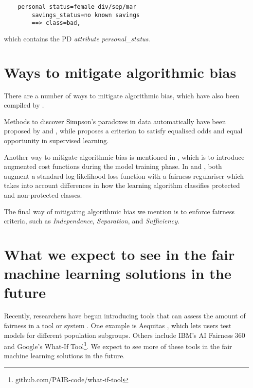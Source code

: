 \documentclass[conference]{IEEEtran}
\begin{document}
\begin{lstlisting}
    personal_status=female div/sep/mar 
        savings_status=no known savings 
        ==> class=bad,    
\end{lstlisting}

which contains the PD \emph{attribute personal\_status}.

\section{Ways to mitigate algorithmic bias}
There are a number of ways to mitigate algorithmic bias, which have also been compiled by \cite{DBLP:journals/corr/abs-1908-09635}.

Methods to discover Simpson’s paradoxes in data automatically have been proposed by \cite{DBLP:journals/corr/abs-1801-04385} and \cite{DBLP:journals/corr/abs-1805-03094}, while \cite{DBLP:journals/corr/HardtPS16} proposes a criterion to satisfy equalised odds and equal opportunity in supervised learning.

Another way to mitigate algorithmic bias is mentioned in \cite{d_Alessandro_2017}, which is to introduce augmented cost functions during the model training phase. In \cite{article} and \cite{DBLP:journals/corr/Zliobaite15}, both augment a standard log-likelihood loss function with a fairness regulariser which takes into account differences in how the learning algorithm classifies protected and non-protected classes.

The final way of mitigating algorithmic bias we mention is to enforce fairness criteria, such as \emph{Independence}, \emph{Separation}, and \emph{Sufficiency}.

\section{What we expect to see in the fair machine learning solutions in the future}
Recently, researchers have begun introducing tools that can assess the amount of fairness in a tool or system \cite{DBLP:journals/corr/abs-1908-09635}. One example is Aequitas \cite{DBLP:journals/corr/abs-1811-05577}, which lets users test models for different population subgroups. Others include IBM's AI Fairness 360 \cite{aif360-oct-2018} and Google's What-If Tool\footnote{github.com/PAIR-code/what-if-tool}. We expect to see more of these tools in the fair machine learning solutions in the future.



\end{document}
